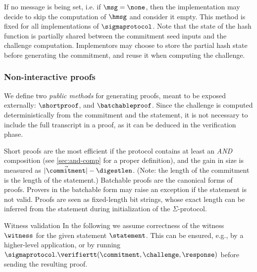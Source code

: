 \documentclass[11pt]{article}
\begin{document}
If no message is being set, i.e. if $\msg = \none$, then the implementation may decide to skip the computation of $\hmsg$ and consider it empty.
This method is fixed for all implementations of $\sigmaprotocol$. Note that the state of the hash function is partially shared between the commitment seed inputs and the challenge computation. Implementors may choose to store the partial hash state before generating the commitment, and reuse it when computing the challenge.






\subsubsection{Non-interactive proofs}

We define two \emph{public methods} for generating proofs, meant to be exposed externally: $\shortproof$, and $\batchableproof$.
Since the challenge is computed deterministically from the commitment and the statement, it is not necessary to include the full transcript in a proof, as it can be deduced in the verification phase.

Short proofs are the most efficient if the protocol contains at least an \emph{AND} composition (see \cref{sec:and-comp} for a proper definition), and the gain in size is measured as $|\vec \commitment| - \digestlen$.
(Note: the length of the commitment is the length of the statement.)
Batchable proofs are the canonical forms of proofs.
Provers in the batchable form may raise an exception if the statement is not valid.
Proofs are seen as fixed-length bit strings, whose exact length can be inferred from the statement during initialization of the $\Sigma$-protocol.

\begin{remark}{Witness validation}{}
  In the following we assume correctness of the witness $\witness$ for the given statement $\statement$.
	This can be ensured, e.g., by a higher-level application, or by running $\sigmaprotocol.\verifiertt(\commitment, \challenge, \response)$ before sending the resulting proof.
\end{remark}
\end{document}
